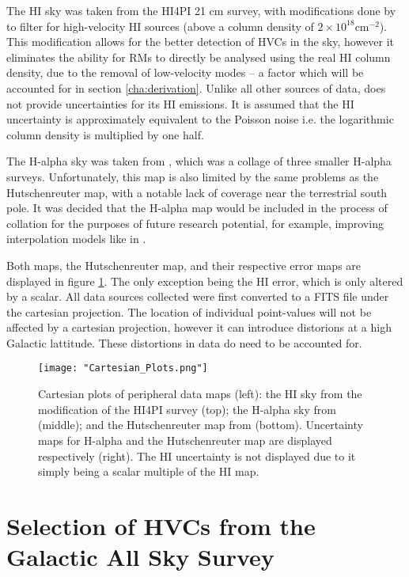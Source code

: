The HI sky was taken from the HI4PI 21 cm survey, with modifications done by \cite{ID6} to filter for high-velocity HI sources (above a column density of $2\times 10^{18} \mathrm{cm}^{-2}$). This modification allows for the better detection of HVCs in the sky, however it eliminates the ability for RMs to directly be analysed using the real HI column density, due to the removal of low-velocity modes – a factor which will be accounted for in section \ref{cha:derivation}. Unlike all other sources of data, \cite{ID6} does not provide uncertainties for its HI emissions. It is assumed that the HI uncertainty is approximately equivalent to the Poisson noise i.e. the logarithmic column density is multiplied by one half.


The H-alpha sky was taken from \cite{ID43}, which was a collage of three smaller H-alpha surveys. Unfortunately, this map is also limited by the same problems as the Hutschenreuter map, with a notable lack of coverage near the terrestrial south pole. It was decided that the H-alpha map would be included in the process of collation for the purposes of future research potential, for example, improving interpolation models like in \cite{ID45, ID44}.


Both maps, the Hutschenreuter map, and their respective error maps are displayed in figure \ref{fig:maps}. The only exception being the HI error, which is only altered by a scalar. All data sources collected were first converted to a FITS file under the cartesian projection. The location of individual point-values will not be affected by a cartesian projection, however it can introduce distorions at a high Galactic lattitude. These distortions in data do need to be accounted for.

\begin{figure}
    \texttt{[image: "Cartesian\_Plots.png"]}
    \centering
    \caption{Cartesian plots of peripheral data maps (left): the HI sky from the \cite{ID6} modification of the HI4PI survey (top); the H-alpha sky from \cite{ID43} (middle); and the Hutschenreuter map from \cite{ID44, ID45} (bottom). Uncertainty maps for H-alpha and the Hutschenreuter map are displayed respectively (right). The HI uncertainty is not displayed due to it simply being a scalar multiple of the HI map.}
    \label{fig:maps}
\end{figure}

\section{Selection of HVCs from the Galactic All Sky Survey}
\label{sec:hvc_sel}

